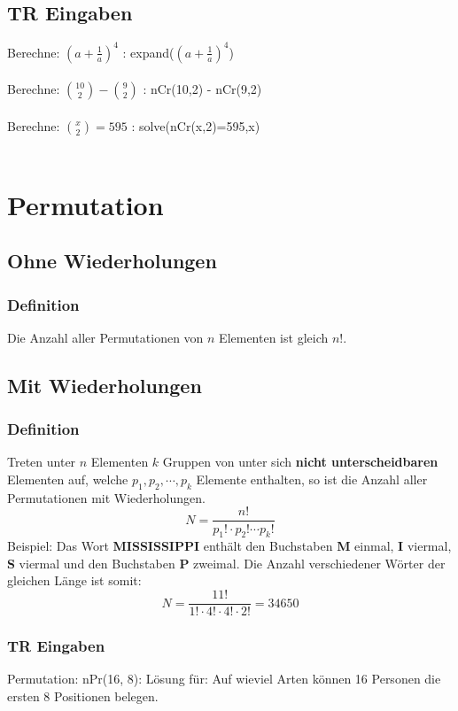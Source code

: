 \documentclass[12pt,a4paper]{article} %
\begin{document}
\subsection{TR Eingaben}
Berechne: $(a+\frac{1}{a})^4$ : expand($(a+\frac{1}{a})^4$)\\\\
Berechne: $\binom {10}{2} - \binom {9}{2}$ : nCr(10,2) - nCr(9,2)\\\\
Berechne: $\binom {x}{2} = 595$ : solve(nCr(x,2)=595,x)\\\\

\section{Permutation}

\subsection{Ohne Wiederholungen}
\subsubsection{Definition}
Die Anzahl aller Permutationen von $n$ Elementen ist gleich $n!$.

\subsection{Mit Wiederholungen}
\subsubsection{Definition}
Treten unter $n$ Elementen $k$ Gruppen von unter sich \textbf{nicht unterscheidbaren} Elementen auf, welche $p_1, p_2, \cdots , p_k$ Elemente enthalten, so ist die Anzahl aller Permutationen mit Wiederholungen.
$$N=\frac{n!}{p_1! \cdot p_2! \cdots p_k!}$$
Beispiel: Das Wort \textbf{MISSISSIPPI} enthält den Buchstaben \textbf{M} einmal, \textbf{I} viermal, \textbf{S} viermal und den Buchstaben \textbf{P} zweimal. Die Anzahl verschiedener Wörter der gleichen Länge ist somit:
$$N=\frac{11!}{1!\cdot 4! \cdot 4! \cdot 2!} = 34650$$
\subsubsection{TR Eingaben}
Permutation: nPr(16, 8): Lösung für: Auf wieviel Arten können 16 Personen die ersten 8 Positionen belegen.
\end{document}
